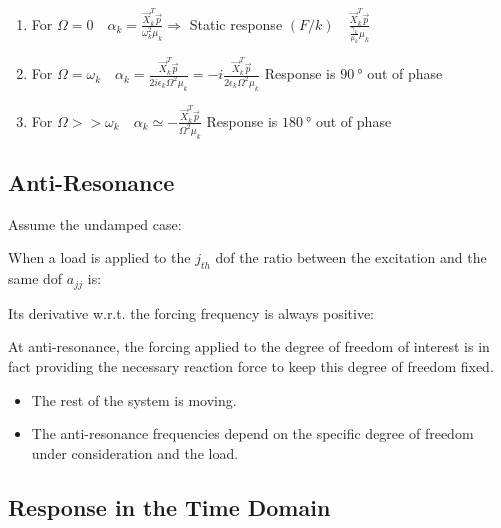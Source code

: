 \documentclass[10pt,a4paper]{scrartcl}
\begin{document}
\begin{multicols*}{2}
\vspace{3ex}

\begin{enumerate}
\item For $\Omega=0\quad\alpha_k=\frac{\vec{X}_k^T\vec{p}}{\omega_k^2\mu_k}\Rightarrow$ Static response $(F/k)\quad \frac{\vec{X}_k^T\vec{p}}{\frac{\gamma_k}{\mu_k}\mu_k}$

\item For $\Omega=\omega_k\quad\alpha_k=\frac{\vec{X}_k^T\vec{p}}{2i\epsilon_k\Omega^2\mu_k}=-i\frac{\vec{X}_k^T\vec{p}}{2\epsilon_k\Omega^2\mu_k}$ Response is $\SI{90}{\degree}$ out of phase
\item For $\Omega>>\omega_k\quad\alpha_k\simeq-\frac{\vec{X}_k^T\vec{p}}{\Omega^2\mu_k}$ Response is $\SI{180}{\degree}$ out of phase
\end{enumerate}

\subsection{Anti-Resonance}

Assume the undamped case:


When a load is applied to the $j_{th}$ dof the ratio between the excitation and the same dof $a_{jj}$ is:


Its derivative w.r.t. the forcing frequency is always positive:


At anti-resonance, the forcing applied to the degree of freedom of interest is in fact providing the necessary reaction force to keep this degree of freedom fixed.

\begin{itemize}
\item The rest of the system is moving.
\item The anti-resonance frequencies depend on the specific degree of freedom under consideration and the load.
\end{itemize}

\subsection{Response in the Time Domain}


\end{multicols*}
\end{document}
